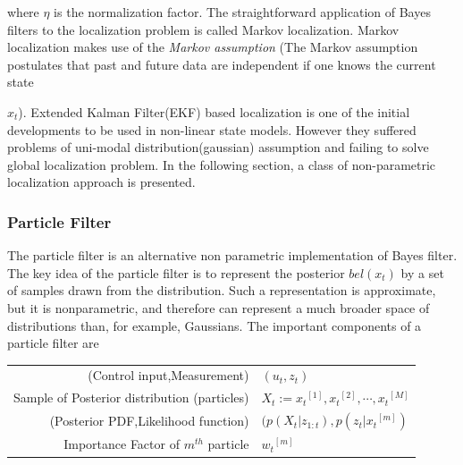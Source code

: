 where $\eta$ is the normalization factor. The straightforward application of Bayes filters to the localization problem is called Markov localization. Markov localization makes use of the \emph{Markov assumption} (The Markov assumption postulates that past and future data are independent if one knows the current state {$x_t$). Extended Kalman Filter(EKF) based localization is one of the initial developments to be used in non-linear state models. However they suffered problems of uni-modal distribution(gaussian) assumption and failing to solve global localization problem. In the following section, a class of non-parametric localization approach is presented. 
\subsubsection{Particle Filter}
\label{ssec:particlefilter}
	The particle filter\cite{thrun2005probabilistic} is an alternative non parametric implementation of Bayes filter. The key idea of the particle filter is to represent the posterior $bel(x_t)$ by a set of samples drawn from the distribution. Such a representation is approximate, but it is nonparametric, and therefore can represent a much broader space of distributions than, for example, Gaussians. The important components of a particle filter are\\
\begin{tabular}{r l}
\centering
  (Control input,Measurement) & $(u_t,z_t)$ \\ 
  Sample of Posterior distribution (particles) & $X_t := {x_t}^{[1]},{x_t}^{[2]},\cdots,{x_t}^{[M]}$ \\
  (Posterior PDF,Likelihood function) & $(p(X_t\vert z_{1:t}),p(z_t \vert {x_t}^{[m]})$ \\
  Importance Factor of $m^{th}$ particle & ${w_t}^{[m]}$ \\
\end{tabular}
	
}
